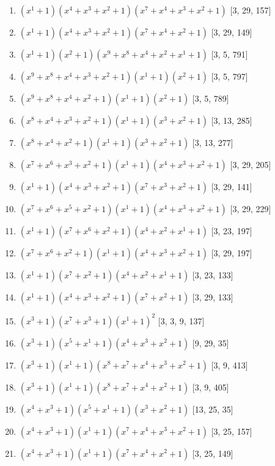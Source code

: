 \documentclass[10pt,twocolumn]{article}
\begin{document}
\begin{enumerate}
\item $(x^{1} + 1)(x^{4} + x^{3} + x^{2} + 1)(x^{7} + x^{4} + x^{3} + x^{2} + 1)$  [3, 29, 157]
\item $(x^{1} + 1)(x^{4} + x^{3} + x^{2} + 1)(x^{7} + x^{4} + x^{2} + 1)$  [3, 29, 149]
\item $(x^{1} + 1)(x^{2} + 1)(x^{9} + x^{8} + x^{4} + x^{2} + x^{1} + 1)$  [3, 5, 791]
\item $(x^{9} + x^{8} + x^{4} + x^{3} + x^{2} + 1)(x^{1} + 1)(x^{2} + 1)$  [3, 5, 797]
\item $(x^{9} + x^{8} + x^{4} + x^{2} + 1)(x^{1} + 1)(x^{2} + 1)$  [3, 5, 789]
\item $(x^{8} + x^{4} + x^{3} + x^{2} + 1)(x^{1} + 1)(x^{3} + x^{2} + 1)$  [3, 13, 285]
\item $(x^{8} + x^{4} + x^{2} + 1)(x^{1} + 1)(x^{3} + x^{2} + 1)$  [3, 13, 277]
\item $(x^{7} + x^{6} + x^{3} + x^{2} + 1)(x^{1} + 1)(x^{4} + x^{3} + x^{2} + 1)$  [3, 29, 205]
\item $(x^{1} + 1)(x^{4} + x^{3} + x^{2} + 1)(x^{7} + x^{3} + x^{2} + 1)$  [3, 29, 141]
\item $(x^{7} + x^{6} + x^{5} + x^{2} + 1)(x^{1} + 1)(x^{4} + x^{3} + x^{2} + 1)$  [3, 29, 229]
\item $(x^{1} + 1)(x^{7} + x^{6} + x^{2} + 1)(x^{4} + x^{2} + x^{1} + 1)$  [3, 23, 197]
\item $(x^{7} + x^{6} + x^{2} + 1)(x^{1} + 1)(x^{4} + x^{3} + x^{2} + 1)$  [3, 29, 197]
\item $(x^{1} + 1)(x^{7} + x^{2} + 1)(x^{4} + x^{2} + x^{1} + 1)$  [3, 23, 133]
\item $(x^{1} + 1)(x^{4} + x^{3} + x^{2} + 1)(x^{7} + x^{2} + 1)$  [3, 29, 133]
\item $(x^{3} + 1)(x^{7} + x^{3} + 1)(x^{1} + 1)^{2}$  [3, 3, 9, 137]
\item $(x^{3} + 1)(x^{5} + x^{1} + 1)(x^{4} + x^{3} + x^{2} + 1)$  [9, 29, 35]
\item $(x^{3} + 1)(x^{1} + 1)(x^{8} + x^{7} + x^{4} + x^{3} + x^{2} + 1)$  [3, 9, 413]
\item $(x^{3} + 1)(x^{1} + 1)(x^{8} + x^{7} + x^{4} + x^{2} + 1)$  [3, 9, 405]
\item $(x^{4} + x^{3} + 1)(x^{5} + x^{1} + 1)(x^{3} + x^{2} + 1)$  [13, 25, 35]
\item $(x^{4} + x^{3} + 1)(x^{1} + 1)(x^{7} + x^{4} + x^{3} + x^{2} + 1)$  [3, 25, 157]
\item $(x^{4} + x^{3} + 1)(x^{1} + 1)(x^{7} + x^{4} + x^{2} + 1)$  [3, 25, 149]

\end{enumerate}
\end{document}
